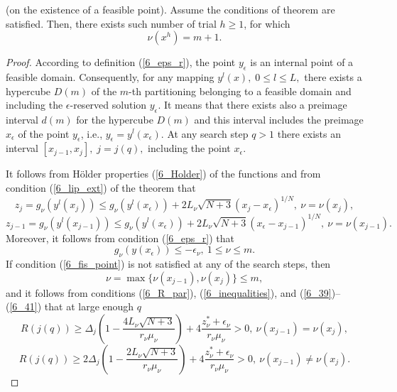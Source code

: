 \begin{lemma} \label{6_lemma2}
(on the existence of a feasible point). 
Assume the conditions of theorem are satisfied. Then, there exists such number of trial $h \geq 1$, for which 
	\begin{equation}\label{6_fis_point}
	\nu(x^h)=m+1.
	\end{equation}
\end{lemma}
\begin{proof}
According to definition (\ref{6_eps_r}), the point $y_\epsilon$ is an internal point of a feasible domain. Consequently, for any mapping $y^l(x),\; 0\leq l \leq L,$ there exists a hypercube $D(m)$ of the $m$-th partitioning belonging to a feasible domain and including the $\epsilon$-reserved solution $y_\epsilon$. It means that there exists also a preimage interval $d(m)$ for the hypercube $D(m)$ and this interval includes the preimage $x_\epsilon$ of the point $y_\epsilon$, i.e., $y_\epsilon=y^l(x_\epsilon)$. At any search step $q>1$ there exists an interval $[x_{j-1},x_j],\; j=j(q),$ including the point $x_\epsilon$.

It follows from H\"older properties (\ref{6_Holder}) of the functions and from condition (\ref{6_lip_ext}) of the theorem that
	\begin{equation}\label{6_39}
	z_j=g_\nu(y^l(x_j))\leq g_\nu(y^l(x_\epsilon))+2L_\nu \sqrt{N+3}(x_j - x_\epsilon)^{1/N},\ \nu=\nu(x_j),
	\end{equation}
	\begin{equation}\label{6_40}
	z_{j-1}=g_\nu(y^l(x_{j-1}))\leq g_\nu(y^l(x_\epsilon))+2L_\nu \sqrt{N+3}(x_\epsilon -x_{j-1})^{1/N},\ \nu=\nu(x_{j-1}).
	\end{equation}
Moreover, it follows from condition (\ref{6_eps_r}) that
	\begin{equation}\label{6_41}
	g_\nu(y(x_\epsilon))\leq -\epsilon_\nu,\ 1\leq \nu \leq m.
	\end{equation}
If condition (\ref{6_fis_point}) is not satisfied at any of the search steps, then
\[
\nu = \max \{ \nu(x_{j-1}),\nu(x_j) \} \leq m,
\]
and it follows from conditions (\ref{6_R_par}), (\ref{6_inequalities}), and (\ref{6_39})--(\ref{6_41}) that at large enough $q$
\[
R(j(q)) \geq \Delta_j \left(1-\frac{4L_\nu\sqrt{N+3}}{r_\nu\mu_\nu}\right) + 4\frac{z_\nu^\ast+\epsilon_\nu}{r_\nu\mu_\nu}>0, \ \nu(x_{j-1})=\nu(x_j),
\]
\[
R(j(q)) \geq 2\Delta_j \left(1-\frac{2L_\nu\sqrt{N+3}}{r_\nu\mu_\nu}\right) + 4\frac{z_\nu^\ast+\epsilon_\nu}{r_\nu\mu_\nu}>0, \ \nu(x_{j-1}) \neq \nu(x_j).
\]


\end{proof}
